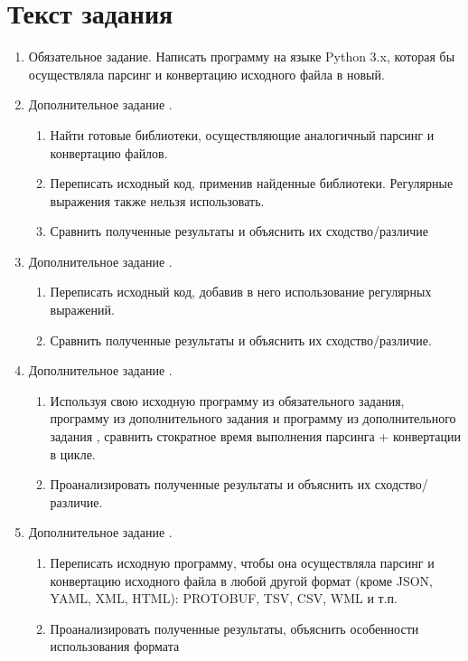 \section{Текст задания}
\begin{enumerate}
    \item Обязательное задание. Написать программу на языке Python 3.x, которая бы осуществляла
    парсинг и конвертацию исходного файла в новый.
    \item Дополнительное задание .
          \begin{enumerate}
              \item Найти готовые библиотеки, осуществляющие аналогичный парсинг и конвертацию файлов.
              \item Переписать исходный код, применив найденные библиотеки.
                    Регулярные выражения также нельзя использовать.
              \item Сравнить полученные результаты и объяснить их сходство/различие
          \end{enumerate}
    \item Дополнительное задание .
    \begin{enumerate}
        \item Переписать исходный код, добавив в него использование регулярных выражений.
        \item Сравнить полученные результаты и объяснить их сходство/различие.
    \end{enumerate}
    \item Дополнительное задание .
    \begin{enumerate}
        \item Используя свою исходную программу из обязательного задания, программу из дополнительного задания  и
        программу из дополнительного задания , сравнить стократное время выполнения парсинга + конвертации в цикле.
        \item Проанализировать полученные результаты и объяснить их сходство/различие.
    \end{enumerate}
    \item Дополнительное задание .
    \begin{enumerate}
        \item Переписать исходную программу, чтобы она осуществляла
        парсинг и конвертацию исходного файла в любой другой
        формат (кроме JSON, YAML, XML, HTML): PROTOBUF,
        TSV, CSV, WML и т.п.
        \item Проанализировать полученные результаты, объяснить
        особенности использования формата
    \end{enumerate}
\end{enumerate}